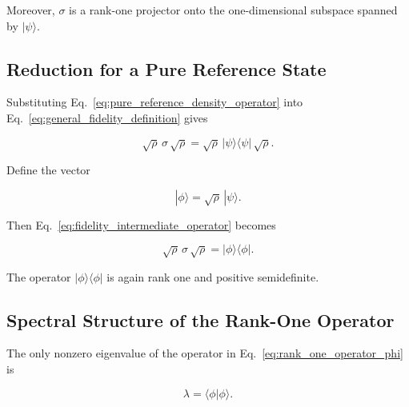 Moreover, \( \sigma \) is a rank-one projector onto the one-dimensional subspace spanned by \( |\psi\rangle \).


\subsection*{Reduction for a Pure Reference State}

Substituting Eq.~\eqref{eq:pure_reference_density_operator} into Eq.~\eqref{eq:general_fidelity_definition} gives

\begin{equation}
\sqrt{\rho}\,
\sigma\,
\sqrt{\rho}
=
\sqrt{\rho}\,
|\psi\rangle\langle\psi|\,
\sqrt{\rho}.
\label{eq:fidelity_intermediate_operator}
\end{equation}

Define the vector

\begin{equation}
|\phi\rangle
=
\sqrt{\rho}\,
|\psi\rangle.
\label{eq:phi_definition}
\end{equation}

Then Eq.~\eqref{eq:fidelity_intermediate_operator} becomes

\begin{equation}
\sqrt{\rho}\,
\sigma\,
\sqrt{\rho}
=
|\phi\rangle\langle\phi|.
\label{eq:rank_one_operator_phi}
\end{equation}

The operator \( |\phi\rangle\langle\phi| \) is again rank one and positive semidefinite.


\subsection*{Spectral Structure of the Rank-One Operator}

The only nonzero eigenvalue of the operator in Eq.~\eqref{eq:rank_one_operator_phi} is

\begin{equation}
\lambda
=
\langle \phi | \phi \rangle.
\label{eq:rank_one_eigenvalue}
\end{equation}

